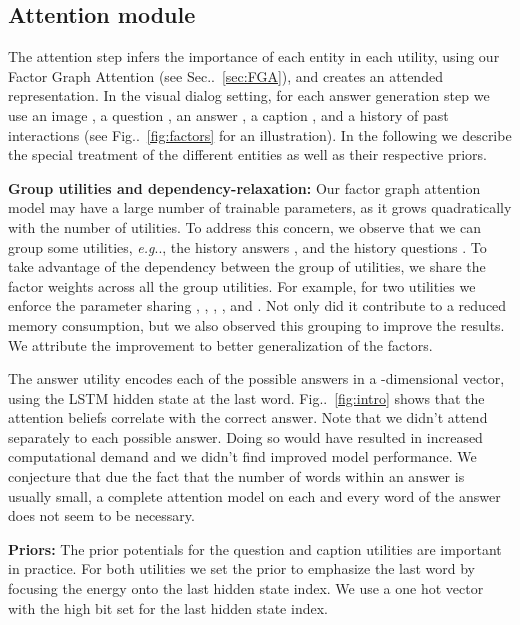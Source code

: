 \documentclass[10pt,twocolumn,letterpaper]{article}
\makeatletter
\def\@onedot{\ifx\@let@token.\else.\null\fi\xspace}
\DeclareRobustCommand\onedot{\futurelet\@let@token\@onedot}
\newcommand{\figref}[1]{Fig\onedot~\ref{#1}}
\newcommand{\secref}[1]{Sec\onedot~\ref{#1}}
\def\eg{\emph{e.g}\onedot} \def\Eg{\emph{E.g}\onedot}
\makeatother
\begin{document}
	
	






\subsection{Attention module}
\label{sec:atten}

The attention step infers the importance of each entity in each utility, using our Factor Graph Attention (see \secref{sec:FGA}), and creates an attended representation. In the visual dialog setting, for each answer generation step we use an image , a question , an answer , a caption , and a history of past interactions  (see  \figref{fig:factors} for an illustration). In the following we describe the special treatment of the different entities as well as their respective priors. 






\noindent\textbf{Group utilities and dependency-relaxation:} Our factor graph attention model may have a large number of trainable parameters, as it grows quadratically with the number of utilities. To address this concern, we observe that we can group some utilities, \eg, the history answers , and the history questions . To take advantage of the dependency between the group of utilities, we share the factor weights across all the group utilities. For example, for two utilities  we enforce the parameter sharing , , , ,  and . Not only did it contribute to a reduced memory consumption, but we  also observed this grouping to improve the results. We  attribute the improvement to better generalization of the factors. 

The answer utility  encodes each of the possible  answers in a -dimensional vector, using the LSTM hidden state at the last word. \figref{fig:intro} shows that the attention beliefs correlate with the correct answer. Note that we didn't attend separately to each possible answer. Doing so 
would have resulted in increased computational demand and we didn't find improved  model performance. We conjecture that due the fact that the number of words within an answer is usually small, a complete attention model on each and every word of the answer does not seem to be necessary. 



\noindent\textbf{Priors:} The prior potentials for the question and caption utilities are important in practice. For both utilities we set the prior to emphasize the last word by focusing the energy onto the last hidden state index.  We use a one hot vector with the high bit set for the last hidden state index. 
\end{document}
